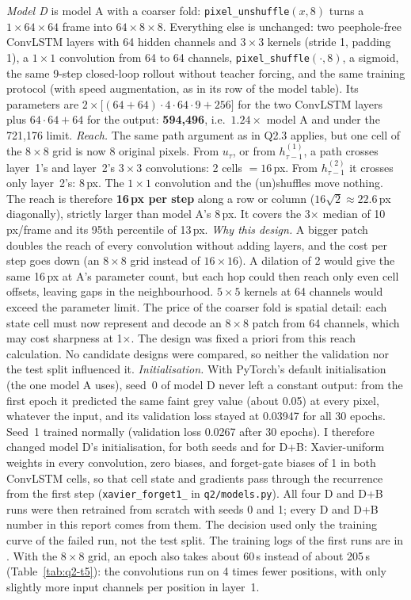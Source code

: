  \emph{Model D} is model A with a coarser fold: \texttt{pixel\_unshuffle}$(x,8)$ turns a
$1\times64\times64$ frame into $64\times8\times8$. Everything else is unchanged: two peephole-free
ConvLSTM layers with 64 hidden channels and $3\times3$ kernels (stride 1, padding 1), a $1\times1$
convolution from 64 to 64 channels, \texttt{pixel\_shuffle}$(\cdot,8)$, a sigmoid, the same 9-step
closed-loop rollout without teacher forcing, and the same training protocol (with speed augmentation, as
in its row of the model table). Its parameters are $2\times\big[(64+64)\cdot4\cdot64\cdot9+256\big]$ for the
two ConvLSTM layers plus $64\cdot64+64$ for the output: \textbf{594,496}, i.e.\ $1.24\times$ model A and
under the 721,176 limit.
\emph{Reach.} The same path argument as in Q2.3 applies, but one cell of the $8\times8$ grid is now
8 original pixels. From $u_\tau$, or from $h^{(1)}_{\tau-1}$, a path crosses layer~1's and layer~2's
$3\times3$ convolutions: 2 cells $=16$\,px. From $h^{(2)}_{\tau-1}$ it crosses only layer~2's: 8\,px.
The $1\times1$ convolution and the (un)shuffles move nothing. The reach is therefore \textbf{16\,px per
step} along a row or column ($16\sqrt2\approx22.6$\,px diagonally), strictly larger than model A's 8\,px.
It covers the 3$\times$ median of 10\,px/frame and its 95th percentile of 13\,px.
\emph{Why this design.} A bigger patch doubles the reach of every convolution without adding layers, and
the cost per step goes down (an $8\times8$ grid instead of $16\times16$). A dilation of 2 would give the
same 16\,px at A's parameter count, but each hop could then reach only even cell offsets, leaving gaps in
the neighbourhood. $5\times5$ kernels at 64 channels would exceed the parameter limit. The price of the
coarser fold is spatial detail: each state cell must now represent and decode an $8\times8$ patch from 64
channels, which may cost sharpness at 1$\times$. The design was fixed a priori from this reach calculation.
No candidate designs were compared, so neither the validation nor the test split influenced it.
\emph{Initialisation.} With PyTorch's default initialisation (the one model A uses), seed~0 of model D
never left a constant output: from the first epoch it predicted the same faint grey value (about 0.05) at every
pixel, whatever the input, and its validation loss stayed at 0.03947 for all 30 epochs. Seed~1
trained normally (validation loss 0.0267 after 30 epochs). I therefore changed model D's initialisation,
for both seeds and for D+B: Xavier-uniform weights in every convolution, zero biases, and forget-gate
biases of 1 in both ConvLSTM cells, so that cell state and gradients pass through the recurrence from
the first step (\texttt{xavier\_forget1\_} in \texttt{q2/models.py}). All four D and D+B runs were then
retrained from scratch with seeds 0 and 1; every D and D+B number in this report comes from them. The decision used
only the training curve of the failed run, not the test split. The training logs of the first runs are in . With the $8\times8$ grid, an epoch also takes
about 60\,s instead of about 205\,s (Table~\ref{tab:q2-t5}): the convolutions run on 4 times fewer
positions, with only slightly more input channels per position in layer~1.

